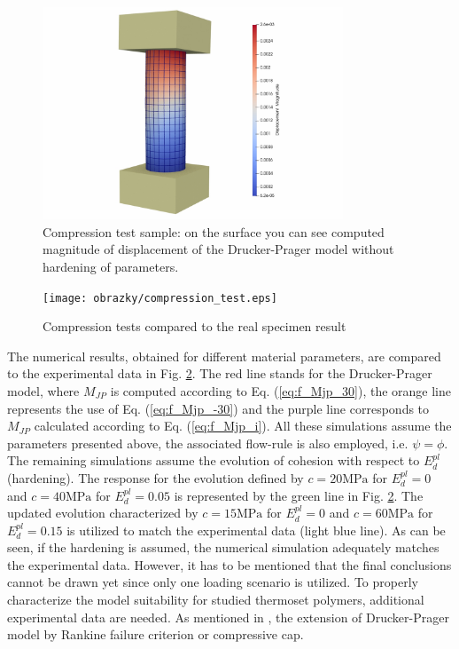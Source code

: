 \begin{figure}[h!]
	\centering
	\includegraphics[width=0.8\textwidth]{obrazky/compression_displacement_magnitude.jpg}
	\caption[Compression test sample]{Compression test sample: on the surface you can see computed magnitude of displacement of the Drucker-Prager model without hardening of parameters.}\label{obr:Compresion_test}
\end{figure}


\begin{figure}[h!]
	\centering
	\texttt{[image: obrazky/compression\_test.eps]}
	\caption[Compresion tests]{Compression tests compared to the real specimen result \cite{Deuch_phd_thesis}}\label{obr:Compresion_2d}
\end{figure}

The numerical results, obtained for different material parameters, are compared to the experimental data \cite{Deuch_phd_thesis} in Fig. \ref{obr:Compresion_2d}. The red line stands for the Drucker-Prager model, where $M_{JP}$ is computed according to Eq. (\ref{eq:f_Mjp_30}), the orange line represents the use of Eq. (\ref{eq:f_Mjp_-30}) and the purple line corresponds to $M_{JP}$ calculated according to Eq. (\ref{eq:f_Mjp_i}). All these simulations assume the parameters presented above, the associated flow-rule is also employed, i.e. $\psi=\phi$. The remaining simulations assume the evolution of cohesion with respect to $E_d^{pl}$ (hardening). The response for the evolution defined by $c=20\mathrm{MPa}$ for $E_d^{pl}=0$ and $c=40\mathrm{MPa}$ for $E_d^{pl}=0.05$ is represented by the green line in Fig. \ref{obr:Compresion_2d}. The updated evolution characterized by $c=15\mathrm{MPa}$ for $E_d^{pl}=0$ and $c=60\mathrm{MPa}$ for $E_d^{pl}=0.15$ is utilized to match the experimental data (light blue line). As can be seen, if the hardening is assumed, the numerical simulation adequately matches the experimental data. However, it has to be mentioned that the final conclusions cannot be drawn yet since only one loading scenario is utilized. To properly characterize the model suitability for studied thermoset polymers, additional experimental data are needed.  As mentioned in \cite{Deuch_phd_thesis}, the extension of Drucker-Prager model by Rankine failure criterion or compressive cap. 

